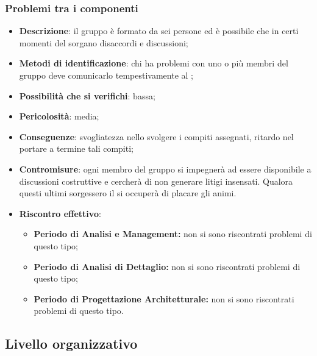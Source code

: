 		
		\subsubsection{Problemi tra i componenti}
		\begin{itemize}
			\item \textbf{Descrizione}: il gruppo è formato da sei persone ed è possibile che in certi momenti del  sorgano disaccordi e discussioni;
			\item \textbf{Metodi di identificazione}: chi ha problemi con uno o più membri del gruppo deve comunicarlo tempestivamente al \RES{};
			\item \textbf{Possibilità che si verifichi}: bassa;
			\item \textbf{Pericolosità}: media;
			\item \textbf{Conseguenze}: svogliatezza nello svolgere i compiti assegnati, ritardo nel portare a termine tali compiti;
			\item \textbf{Contromisure}: ogni membro del gruppo si impegnerà ad essere disponibile a discussioni costruttive e cercherà di non generare litigi insensati. Qualora questi ultimi sorgessero il \RES{} si occuperà di placare gli animi.
			\item \textbf{Riscontro effettivo}:
			\begin{itemize}
				\item \textbf{Periodo di Analisi e Management:} non si sono riscontrati problemi di questo tipo; 
				\item \textbf{Periodo di Analisi di Dettaglio:} non si sono riscontrati problemi di questo tipo;
				\item \textbf{Periodo di Progettazione Architetturale:} non si sono riscontrati problemi di questo tipo.
			\end{itemize}
		\end{itemize}
	
	\subsection{Livello organizzativo}
